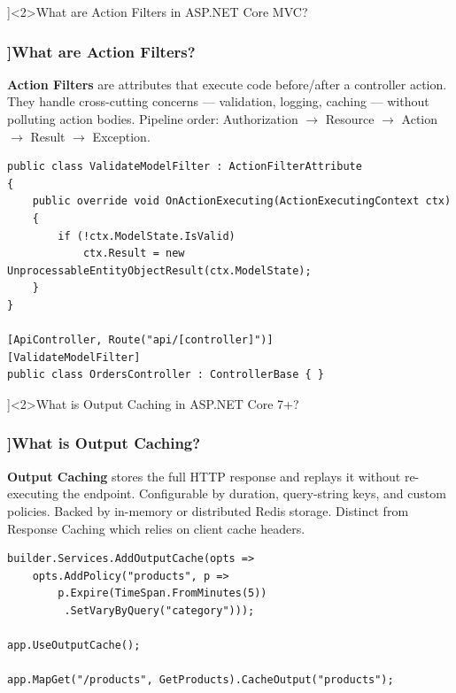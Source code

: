 \QuestionSlide[\CategoryBadge[AspNetColor!20]{ASP.NET Core}]<2>{What are Action Filters in ASP.NET Core MVC?}

\begin{frame}[fragile]
  \frametitle{\AnswerTitle[\CategoryBadge[AspNetColor!20]{ASP.NET Core}]{What are Action Filters?}}

  {\footnotesize
  \textbf{Action Filters} are attributes that execute code before/after a controller action. They handle cross-cutting concerns — validation, logging, caching — without polluting action bodies. Pipeline order: Authorization $\to$ Resource $\to$ Action $\to$ Result $\to$ Exception.
  }

  \begin{verbatim}
public class ValidateModelFilter : ActionFilterAttribute
{
    public override void OnActionExecuting(ActionExecutingContext ctx)
    {
        if (!ctx.ModelState.IsValid)
            ctx.Result = new UnprocessableEntityObjectResult(ctx.ModelState);
    }
}

[ApiController, Route("api/[controller]")]
[ValidateModelFilter]
public class OrdersController : ControllerBase { }
  \end{verbatim}
\end{frame}

\QuestionSlide[\CategoryBadge[AspNetColor!20]{ASP.NET Core}]<2>{What is Output Caching in ASP.NET Core 7+?}

\begin{frame}[fragile]
  \frametitle{\AnswerTitle[\CategoryBadge[AspNetColor!20]{ASP.NET Core}]{What is Output Caching?}}

  {\footnotesize
  \textbf{Output Caching} stores the full HTTP response and replays it without re-executing the endpoint. Configurable by duration, query-string keys, and custom policies. Backed by in-memory or distributed Redis storage. Distinct from Response Caching which relies on client cache headers.
  }

  \begin{verbatim}
builder.Services.AddOutputCache(opts =>
    opts.AddPolicy("products", p =>
        p.Expire(TimeSpan.FromMinutes(5))
         .SetVaryByQuery("category")));

app.UseOutputCache();

app.MapGet("/products", GetProducts).CacheOutput("products");
  \end{verbatim}
\end{frame}

